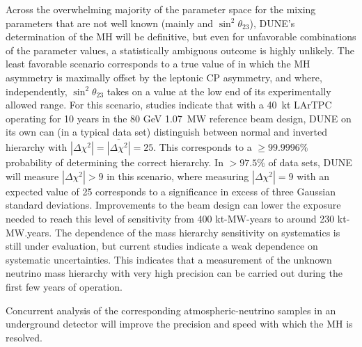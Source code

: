 Across the overwhelming majority of the parameter space for the mixing
parameters that are not well known (mainly \deltacp and
$\sin^2{\theta_{23}}$), DUNE's determination of the MH will be
definitive, but even for unfavorable combinations of the parameter
values, a statistically ambiguous outcome is highly unlikely.  The
least favorable scenario corresponds to a true value of \deltacp in
which the MH asymmetry is maximally offset by the leptonic CP
asymmetry, and where, independently, $\sin^2{\theta_{23}}$ takes on a
value at the low end of its experimentally allowed range.  For
this %
scenario, studies indicate that with a 40~kt %
LArTPC operating for %
10 years in the 80 GeV 1.07~MW reference beam design, DUNE on its own
can (in a typical data set) distinguish between normal and inverted
hierarchy with $|\Delta \chi^2| = \overline{|\Delta \chi^2|} = 25$.
This corresponds to a $\geq 99.9996\%$ probability of determining the
correct hierarchy.  In $>97.5\%$ of data sets, DUNE will measure
$|\Delta \chi^2| > 9$ in this scenario, where measuring
$|\Delta\chi^2| = 9$ with an expected value of \num{25} corresponds to
a significance in excess of three Gaussian standard
deviations. Improvements to the beam design can lower the exposure
needed to reach this level of sensitivity from 400 kt-MW-years to
around 230 kt-MW.years. The dependence of the mass hierarchy
sensitivity on systematics is still under evaluation, but current
studies indicate a weak dependence on systematic uncertainties. This
indicates that a measurement of the unknown neutrino mass hierarchy
with very high precision can be carried out during the first few years
of operation.

Concurrent analysis of the corresponding atmospheric-neutrino samples
in an underground detector will improve the precision and speed with
which the MH is resolved.


